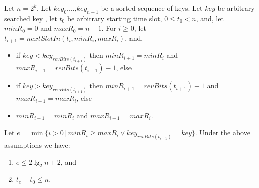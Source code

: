 \documentclass{llncs}
\begin{document}
\begin{theorem}\label{reliable-theorem}
Let $n=2^k$.
Let $key_0$,$\ldots$,$key_{n-1}$ be a sorted sequence of keys.
Let $key$ be arbitrary searched key , 
let $t_0$ be arbitrary starting time slot, $0\le t_0<n$, and,
let $minR_0=0$ and $maxR_0=n-1$.
For $i\ge 0$, let $t_{i+1}= nextSlotIn(t_i, minR_i, maxR_i)$, and,
\begin{itemize}
\item
  if $key<key_{revBits(t_{i+1})}$ then $minR_{i+1}=minR_i$ and $maxR_{i+1}=revBits(t_{i+1})-1$,
  else
\item
  if $key>key_{revBits(t_{i+1})}$ then $minR_{i+1}=revBits(t_{i+1})+1$ and $maxR_{i+1}=maxR_i$,
  else 
\item
  $minR_{i+1}=minR_i$ and $maxR_{i+1}=maxR_i$.
\end{itemize}
Let $e=\min\{i>0 \,|\, minR_i\ge maxR_i \vee key_{revBits(t_{i+1})}=key\}$.
Under the above assumptions we have:
\begin{enumerate}
\item\label{reliable-energy}
  $e\le 2\lg_2 n+2$, and
\item\label{reliable-time}
  $t_e-t_0\le n$.
\end{enumerate}
\end{theorem}
\end{document}
